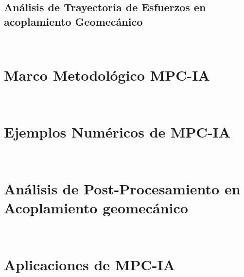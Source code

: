 \subsection{Análisis de Trayectoria de Esfuerzos en acoplamiento Geomecánico}~\hypertarget{sec:sec622}{}
\label{sec:sec622}


\section{Marco Metodológico MPC-IA}~\hypertarget{sec:sec630}{}
\label{sec:sec630}


\section{Ejemplos Numéricos de MPC-IA}~\hypertarget{sec:sec640}{}
\label{sec:sec640}



\section{Análisis de Post-Procesamiento en Acoplamiento geomecánico}~\hypertarget{sec:sec650}{}
\label{sec:sec650}


\section{Aplicaciones de MPC-IA}~\hypertarget{sec:sec660}{}
\label{sec:sec660}


